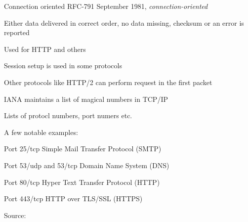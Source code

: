 \documentclass[Screen16to9,17pt]{foils}
\begin{document}
\begin{list1}
\item Connection oriented RFC-791 September 1981, \emph{connection-oriented}
\item Either data delivered in correct order, no data missing, checksum or an error is reported
\item Used for HTTP and others
\end{list1}



\begin{list2}
\item Session setup is used in some protocols
\item Other protocols like HTTP/2 can perform request in the first packet
\end{list2}



\begin{list1}
\item IANA maintains a list of magical numbers in TCP/IP
\item Lists of protocl numbers, port numers etc.
\item A few notable examples:
\begin{list2}
\item Port 25/tcp Simple Mail Transfer Protocol (SMTP)
\item Port 53/udp and 53/tcp Domain Name System (DNS)
\item Port 80/tcp Hyper Text Transfer Protocol (HTTP)
\item Port 443/tcp HTTP over TLS/SSL (HTTPS)
\end{list2}
\item Source: 
\end{list1}




\end{document}
